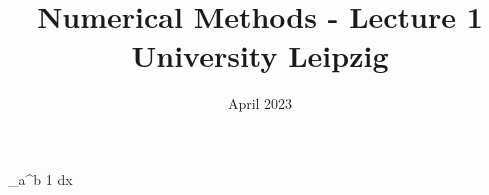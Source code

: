 \documentclass{report}
\title{Numerical Methods - Lecture 1\\
{\Large University Leipzig}}
\date{April 2023}
\newcommand{\integral}[3]{\int_{#1}^{#2} #3 dx}
\theoremstyle{definition}
\theoremstyle{remark}
\begin{document}
    \maketitle
    \tableofcontents
    \integral{a}{b}{1}

    
    
    
    
    
    
    
    
\end{document}
